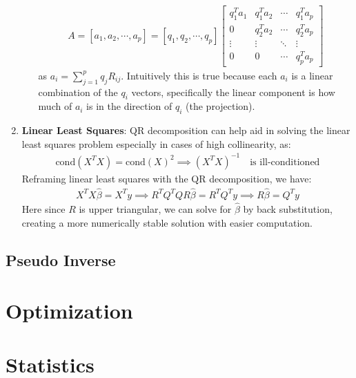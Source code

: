 \documentclass[letterpaper, 11pt]{article}
\newcommand{\1}{\mathds{1}}	%
\theoremstyle{definition}
\begin{document}
\begin{enumerate}
\begin{enumerate}
\begin{align}
            A = [a_1, a_2, \cdots, a_p] = [q_1, q_2, \cdots, q_p] \begin{bmatrix} q_1^T a_1 & q_1^T a_2 & \cdots & q_1^T a_p \\ 0 & q_2^T a_2 & \cdots & q_2^T a_p \\ \vdots & \vdots & \ddots & \vdots \\ 0 & 0 & \cdots & q_p^T a_p \end{bmatrix}
        \end{align}
        as $a_i = \sum_{j=1}^{p} q_j R_{ij}$. Intuitively this is true because each $a_i$ is a linear combination of the $q_i$ vectors, specifically
        the linear component is how much of $a_i$ is in the direction of $q_i$ (the projection).
    \end{enumerate}
    \item \textbf{Linear Least Squares}: QR decomposition can help aid in solving the linear least squares problem 
    especially in cases of high collinearity, as:
    \begin{align}
        \text{cond}(X^T X) = \text{cond}(X)^2 \implies (X^T X)^{-1} \quad \text{is ill-conditioned}
    \end{align} 
    Reframing linear least squares with the QR decomposition, we have:
    \begin{align}
        X^T X \hat{\beta} = X^T y \implies R^T Q^T Q R \hat{\beta} = R^T Q^T y \implies R \hat{\beta} = Q^T y
    \end{align}
    Here since $R$ is upper triangular, we can solve for $\hat{\beta}$ by back substitution, 
    creating a more numerically stable solution with easier computation.
     
\end{enumerate}

\subsection{Pseudo Inverse}

\section{Optimization}

\section{Statistics}
\end{document}
